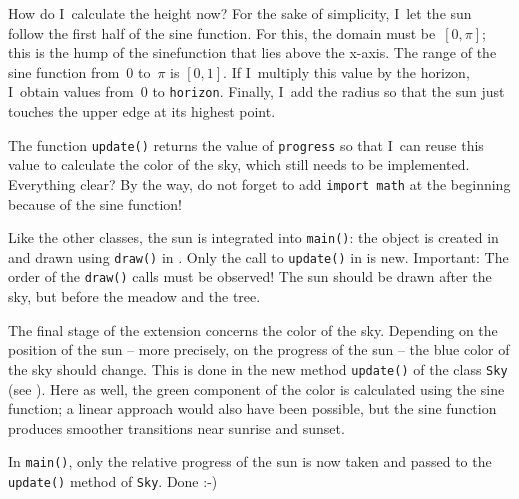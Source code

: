 How do I~calculate the height now? For the sake of simplicity, I~let the sun follow the first half of the sine function. For this, the domain must be~$[0, \pi]$; this is the hump of the \gls{sinefunction} that lies above the x-axis. The range of the sine function from~$0$ to~$\pi$ is $[0, 1]$. If I~multiply this value by the horizon, I~obtain values from~$0$ to \texttt{horizon}. Finally, I~add the radius so that the sun just touches the upper edge at its highest point.

The function \texttt{update()} returns the value of \texttt{progress} so that I~can reuse this value to calculate the color of the sky, which still needs to be implemented. Everything clear? By the way, do not forget to add \texttt{import math} at the beginning because of the sine function!


Like the other classes, the sun is integrated into \texttt{main()}: the object is created in  and drawn using \texttt{draw()} in . Only the call to \texttt{update()} in  is new. Important: The order of the \texttt{draw()} calls must be observed! The sun should be drawn after the sky, but before the meadow and the tree.


The final stage of the extension concerns the color of the sky. Depending on the position of the sun -- more precisely, on the progress of the sun -- the blue color of the sky should change. This is done in the new method \texttt{update()} of the class \texttt{Sky} (see ). Here as well, the green component of the color is calculated using the sine function; a linear approach would also have been possible, but the sine function produces smoother transitions near sunrise and sunset.


In \texttt{main()}, only the relative progress of the sun is now taken and passed to the \texttt{update()} method of \texttt{Sky}. Done :-)

\newpage
{}

